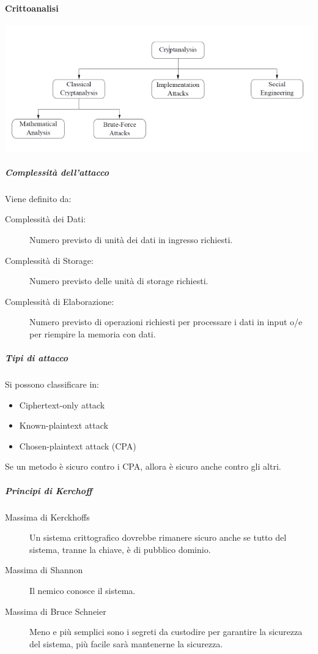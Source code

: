 \documentclass{article}
\begin{document}
    \paragraph{Crittoanalisi}        
            \includegraphics{./immagini/crittoanalisi.png}
               
          \subparagraph{Complessità dell'attacco} Viene definito da:
                \begin{description}
                    \item[Complessità dei Dati:] Numero previsto di unità dei dati in ingresso richiesti.
                    \item[Complessità di Storage:] Numero previsto delle unità di storage richiesti.
                    \item[Complessità di Elaborazione:] Numero previsto di operazioni richiesti per processare i dati in input o/e per riempire la memoria con dati.
                \end{description}
            
           \subparagraph{Tipi di attacco} Si possono classificare in:
               
                \begin{itemize}
                    \item Ciphertext-only attack
                    \item Known-plaintext attack
                    \item Chosen-plaintext attack (CPA)
                \end{itemize}
                Se un metodo è sicuro contro i CPA, allora è sicuro anche contro gli altri.
            \subparagraph{Principi di Kerchoff}

            \begin{description}
                \item[Massima di Kerckhoffs] Un sistema crittografico dovrebbe rimanere sicuro anche se tutto del sistema, tranne la chiave, è di pubblico dominio.
                
                \item[Massima di Shannon] Il nemico conosce il sistema.
                
                \item[Massima di Bruce Schneier] Meno e più semplici sono i segreti da custodire per garantire la sicurezza del sistema, più facile sarà mantenerne la sicurezza.
            \end{description}
\end{document}
